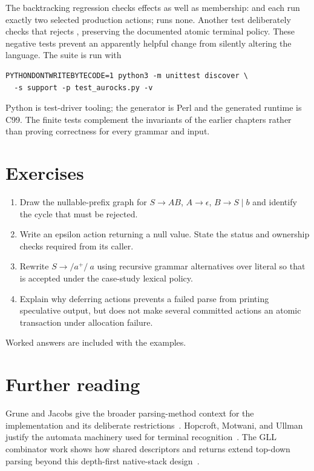 The backtracking regression checks effects as well as membership:  and  each run exactly two selected production actions;  runs none.
Another test deliberately checks that  rejects , preserving the documented atomic terminal policy.
These negative tests prevent an apparently helpful change from silently altering the language.
The suite is run with
\begin{verbatim}
PYTHONDONTWRITEBYTECODE=1 python3 -m unittest discover \
  -s support -p test_aurocks.py -v
\end{verbatim}
Python is test-driver tooling; the generator is Perl and the generated runtime is C99.
The finite tests complement the invariants of the earlier chapters rather than proving correctness for every grammar and input.

\section{Exercises}
\label{sec:ch52-exercises}
\begin{enumerate}
\item\label{ex:ch52-cycle} Draw the nullable-prefix graph for $S\to AB$, $A\to\epsilon$, $B\to S\mid b$ and identify the cycle that must be rejected.
\item\label{ex:ch52-null} Write an epsilon action returning a null value. State the status and ownership checks required from its caller.
\item\label{ex:ch52-atomic} Rewrite $S\to/a^+/\ a$ using recursive grammar alternatives over literal \code{a} so that \code{aa} is accepted under the case-study lexical policy.
\item\label{ex:ch52-effects} Explain why deferring actions prevents a failed parse from printing speculative output, but does not make several committed actions an atomic transaction under allocation failure.
\end{enumerate}
Worked answers are included with the examples.

\section{Further reading}
\label{sec:ch52-reading}
Grune and Jacobs give the broader parsing-method context for the implementation and its deliberate restrictions~\cite{grune-2008-parsing}.
Hopcroft, Motwani, and Ullman justify the automata machinery used for terminal recognition~\cite{hopcroft-2007-automata}.
The GLL combinator work shows how shared descriptors and returns extend top-down parsing beyond this depth-first native-stack design~\cite{vanbinsbergen-2018-gll}.
